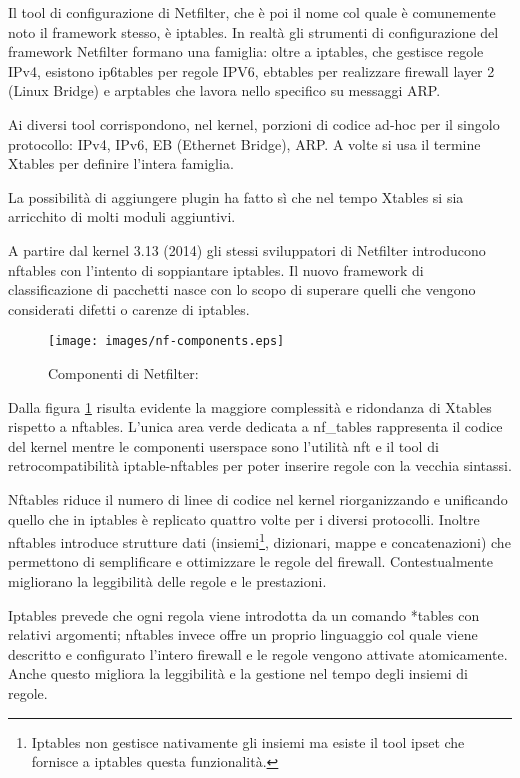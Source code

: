 Il tool di configurazione di Netfilter, che è poi il nome col quale è
comunemente noto il framework stesso, è iptables.
In realtà gli strumenti di configurazione del framework Netfilter formano una
famiglia: oltre a iptables, che gestisce regole IPv4, esistono ip6tables per
regole IPV6, ebtables per realizzare firewall layer 2 (Linux Bridge)
e arptables che lavora nello specifico su messaggi ARP.

Ai diversi tool corrispondono, nel kernel, porzioni di codice ad-hoc per il
singolo protocollo: IPv4, IPv6, EB (Ethernet Bridge), ARP.  A volte si usa
il termine Xtables per definire l'intera famiglia.

La possibilità di aggiungere plugin ha fatto s\`i che nel tempo Xtables si
sia arricchito di molti moduli aggiuntivi.

A partire dal kernel 3.13 (2014) gli stessi sviluppatori di Netfilter
introducono nftables con l'intento
di soppiantare iptables.  Il nuovo framework di classificazione di pacchetti
nasce con lo scopo di superare quelli che vengono considerati difetti o
carenze di iptables.
\begin{figure}[H]
    \texttt{[image: images/nf-components.eps]}
    \caption[Componenti di Netfilter]{Componenti di Netfilter:\footnotemark}
    \label{fig:netfilter}
\end{figure}
\noindent Dalla figura \ref{fig:netfilter} risulta evidente la maggiore complessità e
%
ridondanza di Xtables rispetto a nftables. L'unica area verde dedicata a
nf\_tables rappresenta il codice del kernel mentre le componenti userspace
sono l'utilità nft e il tool di retrocompatibilità iptable-nftables per poter
inserire regole con la vecchia sintassi.

Nftables riduce il numero di linee di codice nel kernel riorganizzando e
unificando quello che in iptables è replicato quattro volte per i diversi protocolli.
Inoltre nftables introduce strutture dati (insiemi\footnote{Iptables non
    gestisce nativamente gli insiemi ma esiste il tool ipset che fornisce a
iptables questa funzionalità.}, dizionari, mappe e concatenazioni) che permettono di
semplificare e ottimizzare le regole del firewall. Contestualmente migliorano la
leggibilità delle regole e le prestazioni.

Iptables prevede che ogni regola viene introdotta da un comando *tables con
relativi argomenti; nftables invece offre un proprio linguaggio col quale
viene descritto e configurato l'intero firewall e le regole vengono attivate
atomicamente. Anche questo migliora la leggibilit\`a e la gestione nel tempo
degli insiemi di regole.

